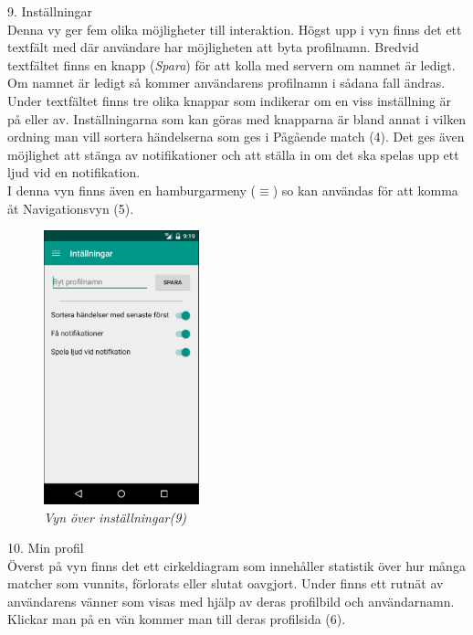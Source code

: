 \documentclass[a4paper, 11pt]{article}
\begin{document}
\pagebreak
\large \textup{9. Inställningar}\\
Denna vy ger fem olika möjligheter till interaktion. Högst upp i vyn finns det ett textfält med där användare har möjligheten att byta profilnamn. Bredvid textfältet finns en knapp (\textit{Spara}) för att kolla med servern om namnet är ledigt. Om namnet är ledigt så kommer användarens profilnamn i sådana fall ändras. Under textfältet finns tre olika knappar som indikerar om en viss inställning är på eller av. Inställningarna som kan göras med knapparna är bland annat i vilken ordning man vill sortera händelserna som ges i Pågående match (4). Det ges även möjlighet att stänga av notifikationer och att ställa in om det ska spelas upp ett ljud vid en notifikation.\\ I denna vyn finns även en hamburgarmeny ($\equiv$) so kan användas för att komma åt Navigationsvyn (5).
\begin{figure}[H]
	\begin{center}
	\includegraphics[width=0.4\textwidth]{app_settings} 
	\end{center}
	\caption{\textit{Vyn över inställningar(9)}}
\end{figure}
\pagebreak
\large \textup{10. Min profil}\\
Överst på vyn finns det ett cirkeldiagram som innehåller statistik över hur många matcher som vunnits, förlorats eller slutat oavgjort. Under finns ett rutnät av användarens vänner som visas med hjälp av deras profilbild och användarnamn. Klickar man på en vän kommer man till deras profilsida (6). 
\end{document}
